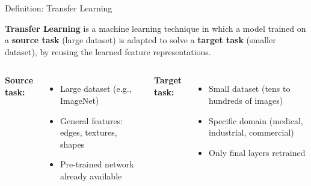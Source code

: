 \documentclass[aspectratio=169,xcolor=dvipsnames]{beamer}
\begin{document}
\begin{frame}{Definition: Transfer Learning}
    \begin{block}{}
        \textbf{Transfer Learning} is a machine learning technique in which a model trained on a \textbf{source task} (large dataset) is adapted to solve a \textbf{target task} (smaller dataset), by reusing the learned feature representations.
    \end{block}
    \vspace{0.3cm}
    \begin{columns}
        \textbf{Source task:}
        \begin{itemize}
            \item Large dataset (e.g., ImageNet)
            \item General features: edges, textures, shapes
            \item Pre-trained network already available
        \end{itemize}
        \textbf{Target task:}
        \begin{itemize}
            \item Small dataset (tens to hundreds of images)
            \item Specific domain (medical, industrial, commercial)
            \item Only final layers retrained
        \end{itemize}
    \end{columns}
\end{frame}
\end{document}
